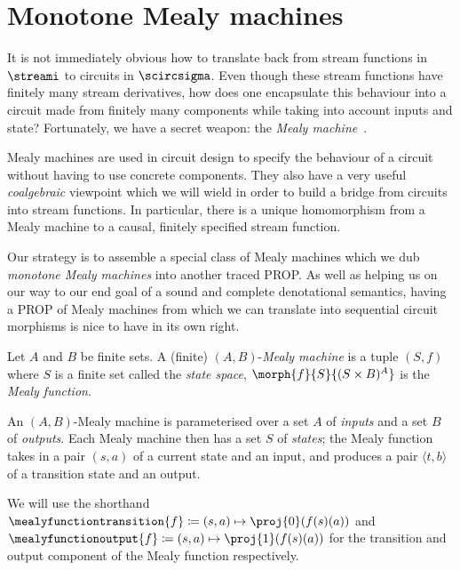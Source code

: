 \section{Monotone Mealy machines}\label{sec:mealy}

It is not immediately obvious how to translate back from stream functions in
\(\streami\) to circuits in \(\scircsigma\).
Even though these stream functions have finitely many stream derivatives, how
does one encapsulate this behaviour into a circuit made from finitely many
components while taking into account inputs and state?
Fortunately, we have a secret weapon: the
\emph{Mealy machine}~\cite{mealy1955method}.

Mealy machines are used in circuit design to specify the behaviour of a circuit
without having to use concrete components.  They also have
a very useful \emph{coalgebraic} viewpoint which we will wield in order to
build a bridge from circuits into stream functions.
In particular, there is a unique homomorphism from a Mealy machine to a causal,
finitely specified stream function.

Our strategy is to assemble a special class of Mealy machines which we dub
\emph{monotone Mealy machines} into another traced PROP.
As well as helping us on our way to our end goal of a sound and complete
denotational semantics, having a PROP of Mealy machines from which we can
translate into sequential circuit morphisms is nice to have in its own right.

\begin{definition}\label{def:mealy}
    Let \(A\) and \(B\) be finite sets.
    A (finite) \((A,B)\)-\emph{Mealy machine} is a tuple \((S, f)\) where
    \(S\) is a finite set called the \emph{state space},
    \(\morph{f}{S}{(S \times B)^A}\) is the \emph{Mealy function}.
\end{definition}

An \((A,B)\)-Mealy machine is parameterised over a set \(A\) of \emph{inputs} and
a set \(B\) of \emph{outputs}.
Each Mealy machine then has a set \(S\) of \emph{states}; the Mealy function
takes in a pair \((s, a)\) of a current state and an input, and
produces a pair \(\langle{t,b}\rangle\) of a transition state and an output.

\begin{notation}
    We will use the shorthand \(
    \mealyfunctiontransition{f} \coloneqq (s, a) \mapsto \proj{0}(f(s)(a))
    \) and \(
    \mealyfunctionoutput{f} \coloneqq (s, a) \mapsto \proj{1}(f(s)(a))
    \) for the transition and output component of the Mealy function respectively.
\end{notation}

